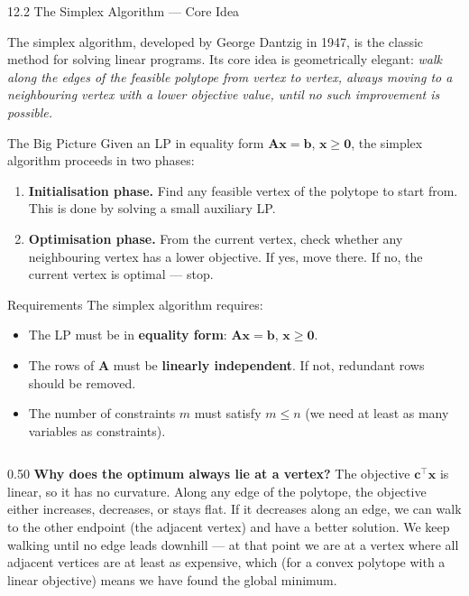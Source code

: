 \documentclass[aspectratio=169,10pt]{beamer}
\newcommand{\xv}{\mathbf{x}}
\newcommand{\cv}{\mathbf{c}}
\newcommand{\bv}{\mathbf{b}}
\newcommand{\Av}{\mathbf{A}}
\begin{document}
\begin{frame}[allowframebreaks]{12.2 The Simplex Algorithm --- Core Idea}

The simplex algorithm, developed by George Dantzig in 1947, is the classic method
for solving linear programs.  Its core idea is geometrically elegant: \emph{walk
along the edges of the feasible polytope from vertex to vertex, always moving to
a neighbouring vertex with a lower objective value, until no such improvement is
possible.}

\begin{block}{The Big Picture}
Given an LP in equality form $\Av\xv = \bv$, $\xv \ge \mathbf{0}$, the simplex
algorithm proceeds in two phases:
\begin{enumerate}
  \item \textbf{Initialisation phase.}  Find any feasible vertex of the polytope
        to start from.  This is done by solving a small auxiliary LP.
  \item \textbf{Optimisation phase.}  From the current vertex, check whether
        any neighbouring vertex has a lower objective.  If yes, move there.
        If no, the current vertex is optimal --- stop.
\end{enumerate}
\end{block}

\begin{block}{Requirements}
The simplex algorithm requires:
\begin{itemize}
  \item The LP must be in \textbf{equality form}: $\Av\xv = \bv$,
        $\xv \ge \mathbf{0}$.
  \item The rows of $\Av$ must be \textbf{linearly independent}.  If not,
        redundant rows should be removed.
  \item The number of constraints $m$ must satisfy $m \le n$ (we need at least
        as many variables as constraints).
\end{itemize}
\end{block}

\framebreak

\begin{columns}
  \begin{column}{0.50\textwidth}
    \textbf{Why does the optimum always lie at a vertex?}
    The objective $\cv^\top\xv$ is linear, so it has no curvature.
    Along any edge of the polytope, the objective either increases, decreases, or
    stays flat.  If it decreases along an edge, we can walk to the other endpoint
    (the adjacent vertex) and have a better solution.  We keep walking until no
    edge leads downhill --- at that point we are at a vertex where all adjacent
    vertices are at least as expensive, which (for a convex polytope with a linear
    objective) means we have found the global minimum.


\end{column}
\end{columns}
\end{frame}
\end{document}
